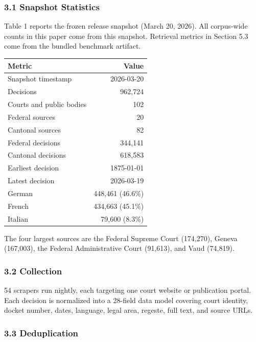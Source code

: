 \documentclass[
  11pt,
]{article}
\newcounter{none} %
\begin{document}
\subsubsection{3.1 Snapshot Statistics}\label{snapshot-statistics}

Table 1 reports the frozen release snapshot (March 20, 2026). All
corpus-wide counts in this paper come from this snapshot. Retrieval
metrics in Section 5.3 come from the bundled benchmark artifact.

{\def\LTcaptype{none} %
\begin{longtable}[]{@{}lr@{}}
\toprule\noalign{}
Metric & Value \\
\midrule\noalign{}
\endhead
\bottomrule\noalign{}
\endlastfoot
Snapshot timestamp & 2026-03-20 \\
Decisions & 962,724 \\
Courts and public bodies & 102 \\
Federal sources & 20 \\
Cantonal sources & 82 \\
Federal decisions & 344,141 \\
Cantonal decisions & 618,583 \\
Earliest decision & 1875-01-01 \\
Latest decision & 2026-03-19 \\
German & 448,461 (46.6\%) \\
French & 434,663 (45.1\%) \\
Italian & 79,600 (8.3\%) \\
\end{longtable}
}

The four largest sources are the Federal Supreme Court (174,270), Geneva
(167,003), the Federal Administrative Court (91,613), and Vaud (74,819).

\subsubsection{3.2 Collection}\label{collection}

54 scrapers run nightly, each targeting one court website or publication
portal. Each decision is normalized into a 28-field data model covering
court identity, docket number, dates, language, legal area, regeste,
full text, and source URLs.

\subsubsection{3.3 Deduplication}\label{deduplication}
\end{document}
